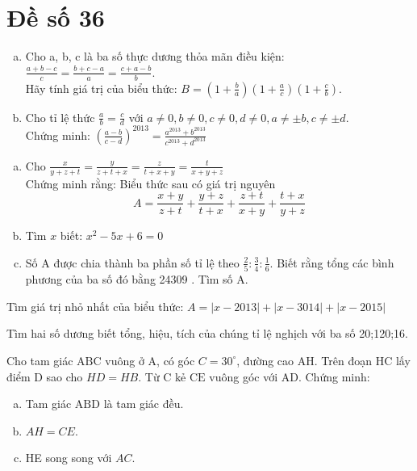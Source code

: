 \section{Đề số 36}

\begin{bt} 
	\hfill
	\begin{enumerate}[a.]
		\item Cho a, b, c là ba số thực dương thỏa mãn điều kiện: $\frac{a+b-c}{c}=\frac{b+c-a}{a}=\frac{c+a-b}{b}$. \\Hãy tính giá trị của biểu thức: $B=\left(1+\frac{b}{a}\right)\left(1+\frac{a}{c}\right)\left(1+\frac{c}{b}\right)$.
		\item Cho tỉ lệ thức $\frac{a}{b}=\frac{c}{d}$ với $a \neq 0, b \neq 0, c \neq 0, d \neq 0, a \neq \pm b, c \neq \pm d$.
		\\Chứng minh: $\left(\frac{a-b}{c-d}\right)^{2013}=\frac{a^{2013}+b^{2013}}{c^{2013}+d^{2013}}$
	\end{enumerate}
	
	\loigiai{} 
\end{bt}

\begin{bt}
	\hfill
	\begin{enumerate}[a.]
		\item Cho $\frac{x}{y+z+t}=\frac{y}{z+t+x}=\frac{z}{t+x+y}=\frac{t}{x+y+z}$
		\\Chứng minh rằng: Biểu thức sau có giá trị nguyên
		$$
		A=\frac{x+y}{z+t}+\frac{y+z}{t+x}+\frac{z+t}{x+y}+\frac{t+x}{y+z}
		$$
		\item Tìm $x$ biết: $x^2-5 x+6=0$
		\item Số $\mathrm{A}$ được chia thành ba phần số tỉ lệ theo $\frac{2}{5}: \frac{3}{4}: \frac{1}{6}$. Biết rằng tổng các bình phương của ba số đó bằng 24309 . Tìm số $\mathrm{A}$.
	\end{enumerate}
	\loigiai{} 
\end{bt}

\begin{bt}
	Tìm giá trị nhỏ nhất của biểu thức: $A=|x-2013|+|x-3014|+|x-2015|$
	\loigiai{} 
\end{bt}

\begin{bt}
	Tìm hai số dương biết tổng, hiệu, tích của chúng tỉ lệ nghịch với ba số 20;120;16.
	\loigiai{}
\end{bt}

\begin{bt}
	Cho tam giác $\mathrm{ABC}$ vuông ở $\mathrm{A}$, có góc $C=30^{\circ}$, đường cao $\mathrm{AH}$. Trên đoạn $\mathrm{HC}$ lấy điểm $\mathrm{D}$ sao cho $H D=H B$. Từ $\mathrm{C}$ kẻ $\mathrm{CE}$ vuông góc với $\mathrm{AD}$. Chứng minh:
	\begin{enumerate}[a.]
		\item Tam giác $\mathrm{ABD}$ là tam giác đều.
		\item $A H=C E$.
		\item HE song song với $A C$.
	\end{enumerate}
	\loigiai{}
\end{bt}


